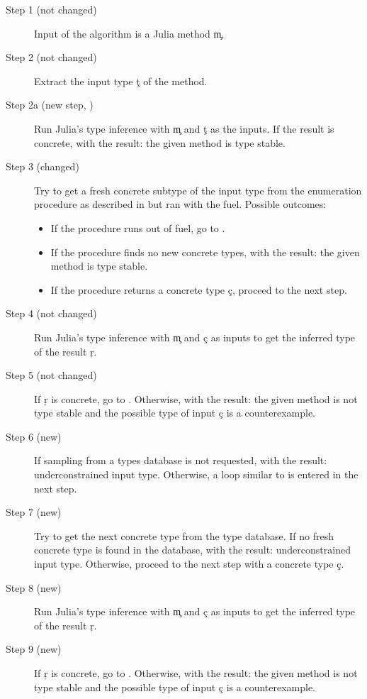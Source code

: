 \begin{description}
  \item[Step 1 (not changed)] Input of the algorithm is a Julia method \c{m}.
  \item[Step 2 (not changed)] Extract the input type \c{t} of the method.
  \item[Step 2a (new step, )]
    Run Julia's type inference with \c m and \c t as the
    inputs. If the result is concrete,  with the result: the given
    method is type stable.
  \item[Step 3 (changed)] Try to get a fresh concrete subtype of the input type
    from the enumeration procedure as described in 
    but ran with the fuel. Possible outcomes:
    \begin{itemize}
      \item If the procedure runs out of fuel, go to
        .
      \item If the procedure finds no new concrete types,  with the
      result: the given method is type stable.
      \item If the procedure returns a concrete type \c c, proceed to the next step.
    \end{itemize}
  \item[Step 4 (not changed)] Run Julia’s type inference with \c m and \c c as
    inputs to get the inferred type of the result \c r.
  \item[Step 5 (not changed)]
    If \c r  is concrete, go to . Otherwise, 
    with the result: the given method is not type stable and the possible type
    of input \c c is a counterexample.
  \item[Step 6 (new)]
    If sampling from a types database is not requested,  with
    the result: underconstrained input type.
    Otherwise,
    a loop similar to
     is entered in the next step.
  \item[Step 7 (new)]
    Try to get the next concrete type from the type database.
    If no fresh concrete type is found in the database,  with
    the result: underconstrained input type.
    Otherwise, proceed to the next step with a concrete type \c c.
  \item[Step 8 (new)]
    Run Julia’s type inference with \c m and \c c as
    inputs to get the inferred type of the result \c r.
  \item[Step 9 (new)]
    If \c r  is concrete, go to . Otherwise, 
    with the result: the given method is not type stable and the possible type
    of input \c c is a counterexample.
\end{description}



